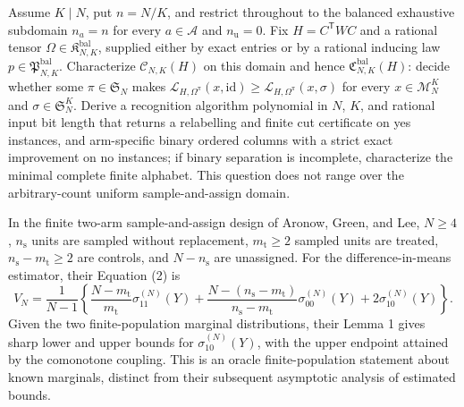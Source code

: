 Assume \(K\mid N\), put \(n=N/K\), and restrict throughout to the balanced exhaustive subdomain \(n_a=n\) for every \(a\in\mathcal A\) and \(n_{\mathrm u}=0\). Fix \(H=C^{\mathsf T}WC\) and a rational tensor \(\Omega\in\mathfrak K^{\mathrm{bal}}_{N,K}\), supplied either by exact entries or by a rational inducing law \(p\in\mathfrak P^{\mathrm{bal}}_{N,K}\). Characterize \(\mathcal C_{N,K}(H)\) on this domain and hence \(\mathfrak C^{\mathrm{bal}}_{N,K}(H)\): decide whether some \(\pi\in\mathfrak S_N\) makes \(\mathscr L_{H,\Omega^{\pi}}(x,\mathrm{id})\geq\mathscr L_{H,\Omega^{\pi}}(x,\sigma)\) for every \(x\in\mathcal M_N^K\) and \(\sigma\in\mathfrak S_N^K\). Derive a recognition algorithm polynomial in \(N\), \(K\), and rational input bit length that returns a relabelling and finite cut certificate on yes instances, and arm-specific binary ordered columns with a strict exact improvement on no instances; if binary separation is incomplete, characterize the minimal complete finite alphabet. This question does not range over the arbitrary-count uniform sample-and-assign domain.

In the finite two-arm sample-and-assign design of Aronow, Green, and Lee, \(N\geq4\), \(n_{\mathrm s}\) units are sampled without replacement, \(m_{\mathrm t}\geq2\) sampled units are treated, \(n_{\mathrm s}-m_{\mathrm t}\geq2\) are controls, and \(N-n_{\mathrm s}\) are unassigned. For the difference-in-means estimator, their Equation (2) is
\[
V_N=\frac1{N-1}\left\{
\frac{N-m_{\mathrm t}}{m_{\mathrm t}}\sigma_{11}^{(N)}(Y)
+\frac{N-(n_{\mathrm s}-m_{\mathrm t})}{n_{\mathrm s}-m_{\mathrm t}}\sigma_{00}^{(N)}(Y)
+2\sigma_{10}^{(N)}(Y)
\right\}.
\]
Given the two finite-population marginal distributions, their Lemma 1 gives sharp lower and upper bounds for \(\sigma_{10}^{(N)}(Y)\), with the upper endpoint attained by the comonotone coupling. This is an oracle finite-population statement about known marginals, distinct from their subsequent asymptotic analysis of estimated bounds.
